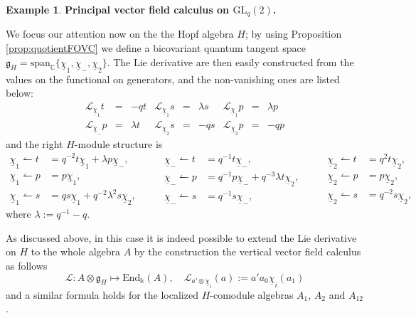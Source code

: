 \documentclass{article}
\theoremstyle{definition}
\newtheorem{example}[thm]{Example}
\begin{document}
{\begin{example} {\bf Principal vector field calculus on $\mathrm{GL}_q(2)$.}
	
	We focus our attention now on the the Hopf algebra $H$; by using Proposition \ref{prop:quotientFOVC} we define a bicovariant quantum tangent space $\mathfrak{g}_H=\mathrm{span}_\mathbb{C}\{\underline{\chi}_1,\underline{\chi}_-,\underline{\chi}_2\}$. 
	The Lie derivative are then easily constructed from the values on the functional on generators, and the non-vanishing ones are listed below:
	$$
	\begin{array}{rclrclrcl}
		\mathscr{L}_{\underline{\chi}_1}t&=&-qt & \mathscr{L}_{\underline{\chi}_1}s&=&\lambda s& \mathscr{L}_{\underline{\chi}_1}p&=&\lambda p\\
		\mathscr{L}_{\underline{\chi}_-}p&=&\lambda t & \mathscr{L}_{\underline{\chi}_2}s&=&-q s & \mathscr{L}_{\underline{\chi}_2}p&=&-q p
	\end{array}
	$$
	and the right $H$-module structure is
	\begin{equation*}
		\begin{split}
			\underline{\chi}_1\leftharpoonup t
			&=q^{-2}t\underline{\chi}_1+\lambda p\underline{\chi}_-,\\
			\underline{\chi}_1\leftharpoonup p
			&=p\underline{\chi}_1,\\
			\underline{\chi}_1\leftharpoonup s
			&=qs\underline{\chi}_1+q^{-2}\lambda^2s\underline{\chi}_2,
		\end{split}\qquad
		\begin{split}
			\underline{\chi}_-\leftharpoonup t
			&=q^{-1}t\underline{\chi}_-,\\
			\underline{\chi}_-\leftharpoonup p
			&=q^{-1}p\underline{\chi}_-+q^{-3}\lambda t\underline{\chi}_2,\\
			\underline{\chi}_-\leftharpoonup s
			&=q^{-1}s\underline{\chi}_-,
		\end{split}\qquad
		\begin{split}
			\underline{\chi}_2\leftharpoonup t
			&=q^2t\underline{\chi}_2,\\
			\underline{\chi}_2\leftharpoonup p
			&=p\underline{\chi}_2,\\
			\underline{\chi}_2\leftharpoonup s
			&=q^{-2}s\underline{\chi}_2,
		\end{split}
	\end{equation*}
	where $\lambda:=q^{-1}-q$.  
	
	As discussed above, in this case it is indeed possible to extend the Lie derivative on $H$ to the whole algebra $A$ by the  construction the vertical vector field calculus as follows
	$$
	\mathscr{L}:A\otimes \mathfrak{g}_H \mapsto  \mathrm{End}_\Bbbk(A),
	\quad \mathscr{L}_{a' \otimes \underline{\chi}_i}(a):=a'a_0\underline{\chi}_i(a_1)
	$$
	and a similar formula holds for the localized $H$-comodule algebras $A_1$, $A_2$ and $A_{12}$.
	

\end{example}}
\end{document}
